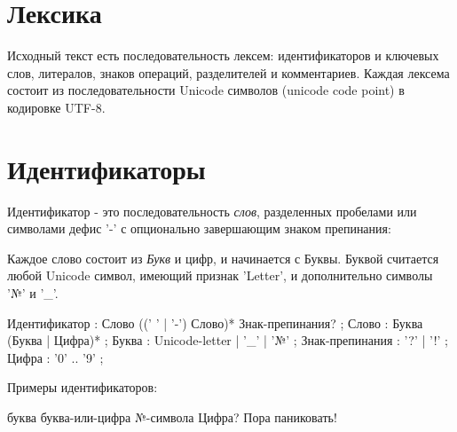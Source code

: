 \hypertarget{lexica}{%
\section{Лексика}\label{lex:chapter}}

Исходный текст есть последовательность лексем: идентификаторов и ключевых слов, литералов, знаков операций, разделителей и комментариев. Каждая лексема состоит из последовательности Unicode символов (unicode code point) в кодировке UTF-8.


\hypertarget{idents}{%
\section{Идентификаторы}\label{lex:idents}}

Идентификатор - это последовательность \emph{слов}, разделенных пробелами или символами дефис '-' с опционально завершающим знаком препинания:

Каждое слово состоит из \emph{Букв} и цифр, и начинается с Буквы. Буквой считается любой Unicode символ, имеющий признак 'Letter', и дополнительно символы '№'
и '\_'. 

\begin{Grammar}
Идентификатор
	: Слово ((' ' | '-') Слово)* Знак-препинания?
	;
Слово
	: Буква (Буква | Цифра)*
	;
Буква
	: Unicode-letter
	| '_'
	| '№'
	;
Знак-препинания
	: '?' 
	| '!' 
	;
Цифра
    : '0' .. '9'
    ;
\end{Grammar}

Примеры идентификаторов:
\begin{Trivil}
буква
буква-или-цифра
№-символа
Цифра?
Пора паниковать!
\end{Trivil}
